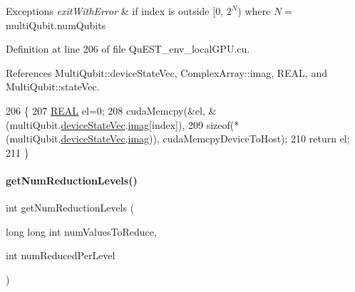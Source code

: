 \begin{DoxyExceptions}{Exceptions}
{\em exit\+With\+Error} & if {\ttfamily index} is outside \mbox{[}0, $2^{N}$) where $N = $ {\ttfamily multi\+Qubit.\+num\+Qubits} \\
\hline
\end{DoxyExceptions}


Definition at line 206 of file Qu\+E\+S\+T\+\_\+env\+\_\+local\+G\+P\+U.\+cu.



References Multi\+Qubit\+::device\+State\+Vec, Complex\+Array\+::imag, R\+E\+AL, and Multi\+Qubit\+::state\+Vec.


\begin{DoxyCode}
206                                                              \{
207     \mbox{\hyperlink{QuEST__precision_8h_a4b654506f18b8bfd61ad2a29a7e38c25}{REAL}} el=0;
208     cudaMemcpy(&el, &(multiQubit.\mbox{\hyperlink{structMultiQubit_a59ac613486a41b8c9a4b6e79cc8d2cc3}{deviceStateVec}}.\mbox{\hyperlink{structComplexArray_a79dde47c7ae530c79cebfdf57b225968}{imag}}[index]), 
209             \textcolor{keyword}{sizeof}(*(multiQubit.\mbox{\hyperlink{structMultiQubit_a59ac613486a41b8c9a4b6e79cc8d2cc3}{deviceStateVec}}.\mbox{\hyperlink{structComplexArray_a79dde47c7ae530c79cebfdf57b225968}{imag}})), cudaMemcpyDeviceToHost);
210     \textcolor{keywordflow}{return} el;
211 \}
\end{DoxyCode}
\mbox{\label{QuEST__env__localGPU_8cu_a112c74b3365bda6697813d9931b55377}} 
\paragraph{\texorpdfstring{get\+Num\+Reduction\+Levels()}{getNumReductionLevels()}}
{\footnotesize\ttfamily int get\+Num\+Reduction\+Levels (\begin{DoxyParamCaption}\item[{long long int}]{num\+Values\+To\+Reduce,  }\item[{int}]{num\+Reduced\+Per\+Level }\end{DoxyParamCaption})}



